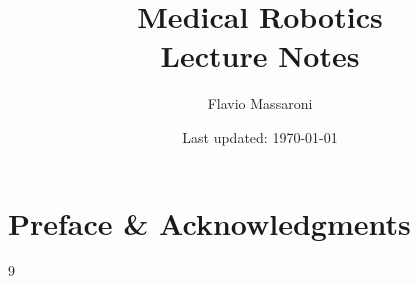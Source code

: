 \documentclass[letterpaper, 12pt]{article}
\newcommand{\1}{\mathds{1}}	%
\theoremstyle{definition}
\begin{document}

\title{Medical Robotics \\[1em]
\normalsize Lecture Notes} %


\author{\normalsize Flavio Massaroni}
\date{\normalsize\vspace{-1ex} Last updated: \today}


\maketitle
\tableofcontents\label{sec:contents}

\newpage %

\section*{Preface \& Acknowledgments}



\vspace{2em}



\begin{thebibliography}{9}


\end{thebibliography}

\end{document}
